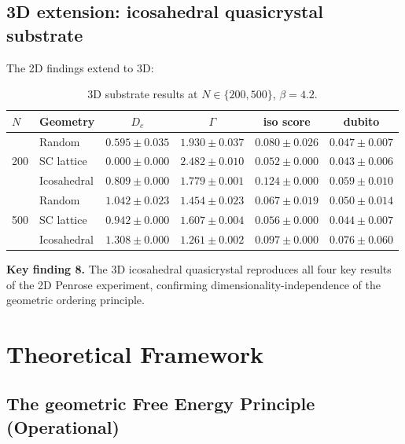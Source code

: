 \documentclass[12pt,a4paper]{article}
\theoremstyle{plain}
\theoremstyle{definition}
\begin{document}
\subsection{3D extension: icosahedral quasicrystal substrate}
\label{sec:3d}

The 2D findings extend to 3D:

\begin{table}[H]
\centering
\caption{3D substrate results at $N \in \{200, 500\}$, $\beta = 4.2$.}
\label{tab:3d_results}
\begin{tabular}{llcccc}
\toprule
$N$ & Geometry & $D_c$ & $\Gamma$ & iso score & dubito \\
\midrule
\multirow{3}{*}{200} &
  Random      & $0.595 \pm 0.035$ & $1.930 \pm 0.037$ &
  $0.080 \pm 0.026$ & $0.047 \pm 0.007$ \\
& SC lattice  & $0.000 \pm 0.000$ & $2.482 \pm 0.010$ &
  $0.052 \pm 0.000$ & $0.043 \pm 0.006$ \\
& Icosahedral & $0.809 \pm 0.000$ & $1.779 \pm 0.001$ &
  $\mathbf{0.124 \pm 0.000}$ & $0.059 \pm 0.010$ \\
\midrule
\multirow{3}{*}{500} &
  Random      & $1.042 \pm 0.023$ & $1.454 \pm 0.023$ &
  $0.067 \pm 0.019$ & $0.050 \pm 0.014$ \\
& SC lattice  & $0.942 \pm 0.000$ & $1.607 \pm 0.004$ &
  $0.056 \pm 0.000$ & $0.044 \pm 0.007$ \\
& Icosahedral & $1.308 \pm 0.000$ & $\mathbf{1.261 \pm 0.002}$ &
  $\mathbf{0.097 \pm 0.000}$ & $0.076 \pm 0.060$ \\
\bottomrule
\end{tabular}
\end{table}

\begin{keyresult}
\textbf{Key finding 8.} The 3D icosahedral quasicrystal reproduces all four
key results of the 2D Penrose experiment, confirming dimensionality-independence
of the geometric ordering principle.
\end{keyresult}

\section{Theoretical Framework}
\label{sec:theory}

\subsection{The geometric Free Energy Principle (Operational)}
\end{document}
